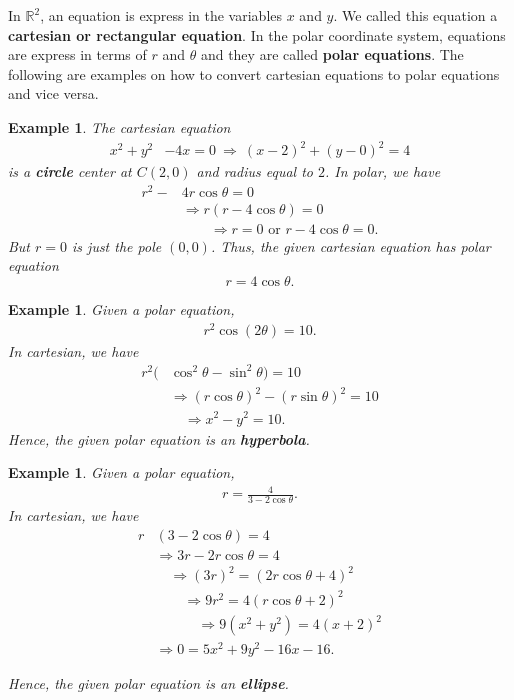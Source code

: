 \documentclass[12pt,twoside]{article}
\newtheorem{example}[theorem]{\bf Example}
\begin{document}
In $\mathbb{R}^2$, an equation is express in the variables $x$ and $y$. We called this equation a {\bf cartesian or rectangular equation}. In the polar coordinate system, equations are express in terms of $r$ and $\theta$ and they are called {\bf polar equations}. The following are examples on how to convert cartesian equations to polar equations and vice versa.

\begin{example}\rm
The cartesian equation
\begin{align*}
x^2+y^2&-4x=0\ \Rightarrow\ (x-2)^2+(y-0)^2=4
\end{align*}
is a {\bf circle} center at $C(2,0)$ and radius equal to $2$.
In polar, we have
\begin{align*}
r^2-&4r\cos\theta=0\\
&\Rightarrow r(r-4\cos\theta)=0\\
&\qquad\Rightarrow r=0\text{ or }r-4\cos\theta=0.
\end{align*}
But $r=0$ is just the pole $(0,0)$. Thus, the given cartesian equation has polar equation
$$r=4\cos\theta.$$
\end{example}

\begin{example}\rm
Given a polar equation,
\begin{align*}
r^2\cos(2\theta)=10.
\end{align*}
In cartesian, we have
\begin{align*}
r^2(&\cos^2\theta-\sin^2\theta)=10\\
&\Rightarrow (r\cos\theta)^2-(r\sin\theta)^2=10\\
&\quad\Rightarrow x^2-y^2=10.
\end{align*}
Hence, the given polar equation is an {\bf hyperbola}.
\end{example}

\begin{example}\rm
Given a polar equation,
\begin{align*}
r=\frac{4}{3-2\cos\theta}.
\end{align*}
In cartesian, we have
\begin{align*}
r&(3-2\cos\theta)=4\\
&\Rightarrow 3r-2r\cos\theta=4\\
&\quad\Rightarrow (3r)^2=(2r\cos\theta+4)^2\\
&\qquad\Rightarrow 9r^2=4(r\cos\theta+2)^2\\
&\quad\qquad\Rightarrow 9(x^2+y^2)=4(x+2)^2\\
&\Rightarrow 0=5x^2+9y^2-16x-16.
\end{align*}

Hence, the given polar equation is an {\bf ellipse}.
\end{example}
\end{document}
